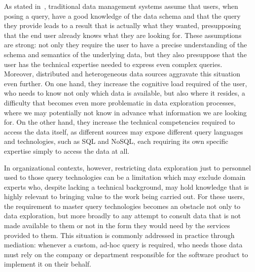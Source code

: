 As stated in~\cite{idreos2015overview}, traditional data management systems
assume that users, when posing a query, have a good knowledge of the data schema
and that the query they provide leads to a result that is actually what they
wanted, presupposing that the end user already knows what they are looking for.
These assumptions are strong: not only they require the user to have a precise
understanding of the schema and semantics of the underlying data, but they
also presuppose that the user has the technical expertise needed to express
even complex queries. Moreover, distributed and heterogeneous data sources
aggravate this situation even further. On one hand, they increase the cognitive
load required of the user, who needs to know not only which data is available,
but also where it resides, a difficulty that becomes even more problematic in
data exploration processes, where we may potentially not know in advance what
information we are looking for. On the other hand, they increase the technical
competencies required to access the data itself, as different sources may expose
different query languages and technologies, such as SQL and NoSQL, each
requiring its own specific expertise simply to access the data at all.

In organizational contexts, however, restricting data exploration just to
personnel used to those query technologies can be a limitation which may exclude
domain experts who, despite lacking a technical background, may hold knowledge
that is highly relevant to bringing value to the work being carried out. For
these users, the requirement to master query technologies becomes an obstacle
not only to data exploration, but more broadly to any attempt to consult
data that is not made available to them or not in the form they would need by
the services provided to them. This situation is commonly addressed in practice
through mediation: whenever a custom, ad-hoc query is required, who needs those
data must rely on the company or department responsible for the software product
to implement it on their behalf. 

